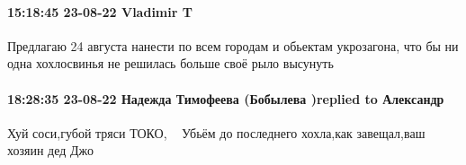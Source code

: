  
 
 
 
 

\paragraph{15:18:45 23-08-22 Vladimir T}

Предлагаю 24 августа нанести по всем городам и обьектам укрозагона, что бы ни
одна хохлосвинья не решилась больше своё рыло высунуть

\paragraph{18:28:35 23-08-22 Надежда Тимофеева (Бобылева )replied to Александр}

Хуй соси,губой тряси ТОКО,🤣🤣🤣 Убьём до последнего хохла,как завещал,ваш
хозяин дед Джо 🤪👊🏼💀💪🏻🇷🇺
